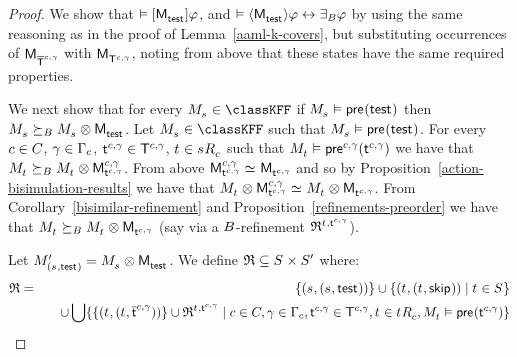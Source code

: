 \begin{proof}
We show that
$\entails \actionA{\aPModel{\aStateTest}} \phi$, and 
$\entails \actionE{\aPModel{\aStateTest}} \phi \iff \someactsBs \phi$
by using the same reasoning as in the proof of Lemma~\ref{aaml-k-covers},
but substituting occurrences of $\aPModel{\aPStatesT[\agentC, \gamma]}$ with $\aPModel{\aStatesT[\agentC, \gamma]}$, noting from above that these states have the same required properties.

We next show that for every $\kPModel{\kStateS} \in \classKFF$ if $\kPModel{\kStateS} \entails \aPrecondition(\aStateTest)$ then $\kPModel{\kStateS} \simulatesBs \kPModel{\kStateS} \exec \aPModel{\aStateTest}$.
Let $\kPModel{\kStateS} \in \classKFF$ such that $\kPModel{\kStateS} \entails \aPrecondition(\aStateTest)$.
For every $\agentC \in \agentsC$, $\gamma \in \Gamma_\agentC$, $\aStateT[\agentC, \gamma] \in \aStatesT[\agentC, \gamma]$, $\kStateT \in \kSuccessorsC{\kStateS}$ such that $\kPModel{\kStateT} \entails \aPrecondition[\agentC,\gamma](\aStateT[\agentC,\gamma])$ we have that $\kPModel{\kStateT} \simulatesBs \kPModel{\kStateT} \exec \aPModel[\agentC, \gamma]{\aStateT[\agentC, \gamma]}$.
From above $\aPModel[\agentC, \gamma]{\aStateT[\agentC, \gamma]} \bisimilar \aPModel{\aStateT[\agentC, \gamma]}$ and so by 
Proposition~\ref{action-bisimulation-results} we have that $\kPModel{\kStateT} \exec \aPModel[\agentC, \gamma]{\aStateT[\agentC, \gamma]} \bisimilar \kPModel{\kStateT} \exec \aPModel{\aStateT[\agentC, \gamma]}$.
From Corollary~\ref{bisimilar-refinement} and Proposition~\ref{refinements-preorder} we have that $\kPModel{\kStateT} \simulatesBs \kPModel{\kStateT} \exec \aPModel{\aStateT[\agentC, \gamma]}$ (say via a $\agentsB$-refinement $\refinement^{\kStateT, \aStateT[\agentC, \gamma]}$).

Let $\kPModelP{(\kStateS, \aStateTest)} = \kPModel{\kStateS} \exec \aPModel{\aStateTest}$.
We define $\refinement \subseteq \kStates \times \kStatesP$ where:
\begin{eqnarray*}
\refinement &=& 
\{(\kStateS, (\kStateS, \aStateTest))\} \cup 
\{(\kStateT, (\kStateT, \aStateSkip)) \mid \kStateT \in \kStates\}  \\&&\quad \cup
\bigcup \{\{(\kStateT, (\kStateT, \aPStateT[\agentC, \gamma]))\} \cup \refinement^{\kStateT, \aStateT[\agentC, \gamma]} \mid \agentC \in \agentsC, \gamma \in \Gamma_\agentC, \aStateT[\agentC, \gamma] \in \aStatesT[\agentC, \gamma], \kStateT \in \kSuccessorsC{\kStateT}, \kPModel{\kStateT} \entails \aPrecondition(\aStateT[\agentC, \gamma])\}
\end{eqnarray*}


\end{proof}
